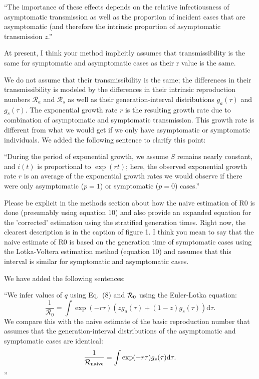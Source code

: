 \documentclass[12pt]{article}
\newcommand{\revtext}{\textsf}
\begin{document}
``The importance of these effects depends on the relative infectiousness of asymptomatic transmission as well as the proportion of incident cases that are asymptomatic (and therefore the intrinsic proportion of asymptomatic transmission $z$.''

\revtext{At present, I think your method implicitly assumes that transmissibility is the same for symptomatic and asymptomatic cases as their r value is the same.}

We do not assume that their transmissibility is the same; the differences in their transmissibility is modeled by the differences in their intrinsic reproduction numbers $\mathcal R_a$ and $\mathcal R_s$ as well as their generation-interval distributions $g_a(\tau)$ and $g_s(\tau)$. The exponential growth rate $r$ is the resulting growth rate due to combination of asymptomatic and symptomatic transmission. This growth rate is different from what we would get if we only have asymptomatic or symptomatic individuals. We added the following sentence to clarify this point:

``During the period of exponential growth, we assume $S$ remains nearly constant, and $i(t)$ is proportional to $\exp(r t)$;
here, the observed exponential growth rate $r$ is an average of the exponential growth rates we would observe if there were only asymptomatic ($p=1$) or symptomatic ($p=0$) cases.''

\revtext{Please be explicit in the methods section about how the naive estimation of R0 is done (presumably using equation 10) and also provide an expanded equation for the 'corrected' estimation using the stratified generation times. Right now, the clearest description is in the caption of figure 1.  I think you mean to say that the naive estimate of R0 is based on the generation time of symptomatic cases using the Lotka-Voltera estimation method (equation 10) and assumes that this interval is similar for symptomatic and asymptomatic cases.}

We have added the following sentences:

``We infer values of $q$ using Eq.~(8) and ${\cal{R}}_0$ using the Euler-Lotka equation:
\begin{equation}
\frac{1}{\mathcal R_0} = \int \exp(-r \tau) \left(z g_a(\tau) + (1-z) g_s(\tau)\right) \mathrm{d} \tau.
\end{equation}
We compare this with the naive estimate of the basic reproduction number that assumes that the generation-interval distributions of the asymptomatic and symptomatic cases are identical:
\begin{equation}
\frac{1}{\mathcal R_{\tiny \textrm{naive}}} = \int \exp(-r \tau) g_s(\tau) \mathrm{d} \tau.
\end{equation}''
\end{document}
